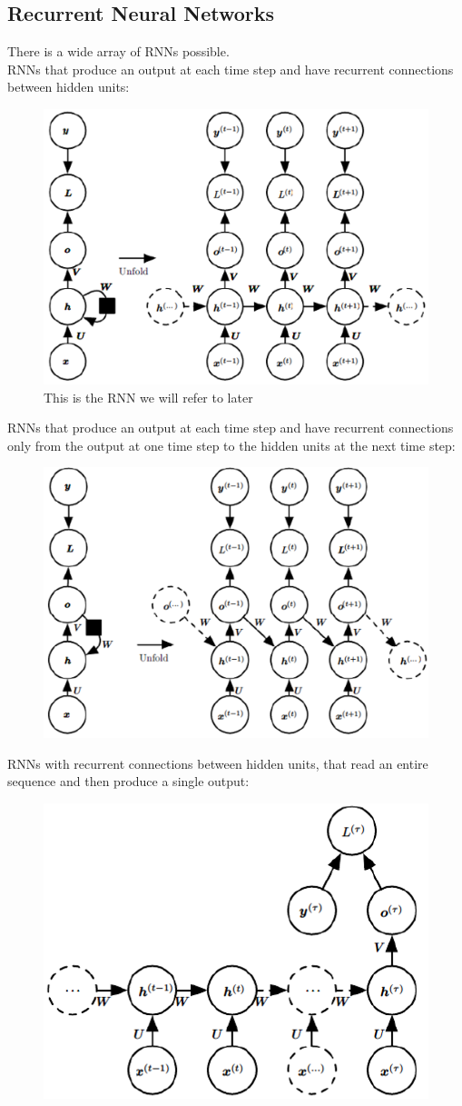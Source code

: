 \begin{multicols}{2}
	\subsection{Recurrent Neural Networks}
	There is a wide array of RNNs possible.\\
	RNNs that produce an output at each time step and have recurrent connections between hidden units:
	\begin{figure}[H]
		\centering
		\includegraphics[width=0.8\linewidth]{images/rec1.PNG}
		\caption{This is the RNN we will refer to later}
	\end{figure}
	RNNs that produce an output at each time step and have recurrent connections only from the output at one time step to the hidden units at the next time step:
	\begin{figure}[H]
		\centering
		\includegraphics[width=0.8\linewidth]{images/rec2.PNG}
	\end{figure}
	RNNs with recurrent connections between hidden units, that read an entire sequence and then produce a single output:
	\begin{figure}[H]
		\centering
		\includegraphics[width=0.7\linewidth]{images/rec3.PNG}

\end{figure}
\end{multicols}
